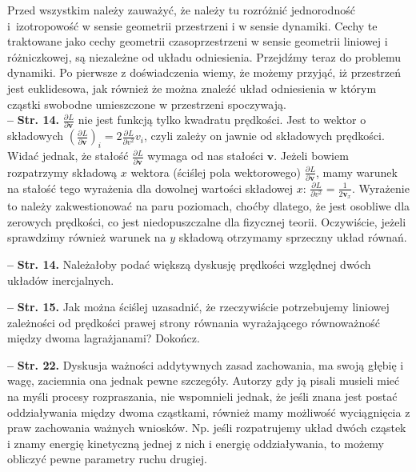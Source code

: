 \documentclass[a4paper,11pt]{article}
\newcommand{\tb}{\textbf}
\newcommand{\noi}{\noindent}
\newcommand{\tb}{\textbf}
\newcommand{\noi}{\noindent}
\newcommand{\start}{\noi \tb{--} {}}
\newcommand{\Str}[1]{\tb{Str. #1.}}
\newcommand{\fr}{\frac}
\newcommand{\pr}{\partial}
\newcommand{\pd}[3]{\fr{ \pr^{ #1 } { #2 } }{ \pr { #3 }^{ #1 } }}
\newcommand{\Dok}{{\color{red} Dokończ.}}
\newcommand{\fr}{\frac}
\newcommand{\pr}{\partial}
\newcommand{\pd}[3]{\fr{ \pr^{ #1 } { #2 } }{ \pr { #3 }^{ #1 } }}
\newcommand{\tb}{\textbf}
\newcommand{\noi}{\noindent}
\newcommand{\start}{\noi \tb{--} {}}
\newcommand{\Str}[1]{\tb{Str. #1.}}
\newcommand{\Dok}{{\color{red} Dokończ.}}
\begin{document}
Przed wszystkim należy zauważyć, że należy tu rozróżnić jednorodność
i~izotropowość w sensie geometrii przestrzeni i w sensie dynamiki.
Cechy te traktowane jako cechy geometrii czasoprzestrzeni w sensie
geometrii liniowej i różniczkowej, są niezależne od układu
odniesienia. Przejdźmy teraz do problemu dynamiki. Po pierwsze z
doświadczenia wiemy, że możemy przyjąć, iż przestrzeń jest
euklidesowa, jak również że można znaleźć układ odniesienia w którym
cząstki swobodne umieszczone w przestrzeni spoczywają. \\
\start \Str{14} $\pd{}{ L }{ \mathbf{ v } }$ nie jest funkcją tylko
kwadratu prędkości. Jest to wektor o składowych
$( \pd{}{ L }{ \mathbf{ v }} )_{ i } = 2 \pd{}{ L }{ { v^{ 2 } } } v_{
  i }$, czyli zależy on jawnie od składowych prędkości. Widać jednak,
że stałość $\pd{}{ L }{ \mathbf{ v } }$ wymaga od nas stałości
$\mathbf{ v }$. Jeżeli bowiem rozpatrzymy składową $x$ wektora
(ściślej pola wektorowego) $\pd{}{ L }{ \mathbf{ v } }$, mamy warunek
na stałość tego wyrażenia dla dowolnej wartości składowej $x$:
$\pd{}{ L }{ { v^{ 2 } } } = \frac{ 1 }{ 2 \mathbf{ v }_{ x } }$.
Wyrażenie to należy zakwestionować na paru poziomach, choćby dlatego,
że jest osobliwe dla zerowych prędkości, co jest niedopuszczalne dla
fizycznej teorii. Oczywiście, jeżeli sprawdzimy również warunek na
$ y $ składową otrzymamy sprzeczny układ równań.

\start \Str{14} Należałoby podać większą dyskusję prędkości względnej
dwóch układów inercjalnych.

\start \Str{15} Jak można ściślej uzasadnić, że rzeczywiście
potrzebujemy liniowej zależności od prędkości prawej strony równania
wyrażającego równoważność między dwoma lagrażjanami? \Dok

\start \Str{22} Dyskusja ważności addytywnych zasad zachowania, ma
swoją głębię i wagę, zaciemnia ona jednak pewne szczegóły. Autorzy gdy
ją pisali musieli mieć na myśli procesy rozpraszania, nie wspomnieli
jednak, że jeśli znana jest postać oddziaływania między dwoma
cząstkami, również mamy możliwość wyciągnięcia z praw zachowania
ważnych wniosków. Np. jeśli rozpatrujemy układ dwóch cząstek i znamy
energię kinetyczną jednej z nich i energię oddziaływania, to możemy
obliczyć pewne parametry ruchu drugiej.
\end{document}
